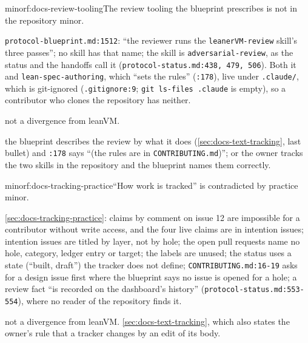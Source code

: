 \begin{finding}{minor}{f:docs-review-tooling}{The review tooling the blueprint prescribes is not in the repository}
 minor.
 \begin{sloppypar}
\texttt{protocol-\allowbreak{}blueprint.\allowbreak{}md:\allowbreak{}1512}: ``the reviewer runs the \texttt{leaner\allowbreak{}VM-\allowbreak{}review} skill's three passes''; no skill has that name; the skill is \texttt{adversarial-\allowbreak{}review}, as the status and the handoffs call it (\texttt{protocol-\allowbreak{}status.\allowbreak{}md:\allowbreak{}438,\allowbreak{} 479,\allowbreak{} 506}). Both it and \texttt{lean-\allowbreak{}spec-\allowbreak{}authoring}, which ``sets the rules'' (\texttt{:\allowbreak{}178}), live under \texttt{.\allowbreak{}claude/\allowbreak{}}, which is git-ignored (\texttt{.\allowbreak{}gitignore:\allowbreak{}9}; \texttt{git ls-\allowbreak{}files .\allowbreak{}claude} is empty), so a contributor who clones the repository has neither.
\end{sloppypar}
 not a divergence from leanVM.
 \begin{sloppypar}
the blueprint describes the review by what it does (\cref{sec:docs-text-tracking}, last bullet) and \texttt{:\allowbreak{}178} says ``(the rules are in \texttt{CONTRIBUTING.\allowbreak{}md})''; or the owner tracks the two skills in the repository and the blueprint names them correctly.
\end{sloppypar}
\end{finding}

\begin{finding}{minor}{f:docs-tracking-practice}{``How work is tracked'' is contradicted by practice}
 minor.
 \begin{sloppypar}
\cref{sec:docs-tracking-practice}: claims by comment on issue 12 are impossible for a contributor without write access, and the four live claims are in intention issues; intention issues are titled by layer, not by hole; the open pull requests name no hole, category, ledger entry or target; the labels are unused; the status uses a state (``built, draft'') the tracker does not define; \texttt{CONTRIBUTING.\allowbreak{}md:\allowbreak{}16-\allowbreak{}19} asks for a design issue first where the blueprint says no issue is opened for a hole; a review fact ``is recorded on the dashboard's history'' (\texttt{protocol-\allowbreak{}status.\allowbreak{}md:\allowbreak{}553-\allowbreak{}554}), where no reader of the repository finds it.
\end{sloppypar}
 not a divergence from leanVM.
 \cref{sec:docs-text-tracking}, which also states the owner's rule that a tracker changes by an edit of its body.
\end{finding}

